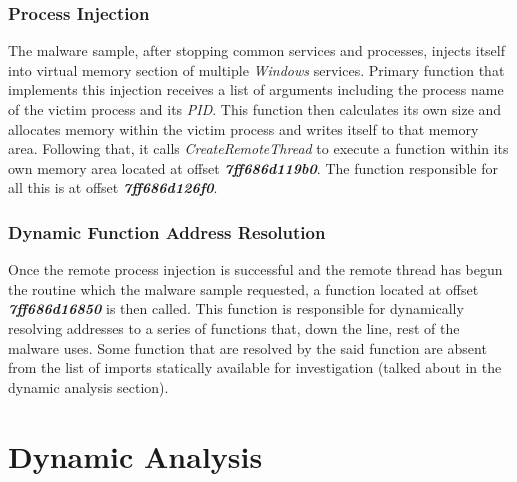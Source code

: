 \documentclass[10pt,a4paper]{article}
\begin{document}
		\subsubsection*{Process Injection}
		\vspace{-1em}
		The malware sample, after stopping common services and processes, injects itself into virtual memory section of multiple \textit{Windows} services.
		Primary function that implements this injection receives a list of arguments including the process name of the victim process and its \textit{PID}.
		This function then calculates its own size and allocates memory within the victim process and writes itself to that memory area.
		Following that, it calls \textit{CreateRemoteThread} to execute a function within its own memory area located at offset \textit{\textbf{7ff686d119b0}}.
		The function responsible for all this is at offset \textit{\textbf{7ff686d126f0}}.

		\subsubsection*{Dynamic Function Address Resolution}
		\vspace{-1em}
		Once the remote process injection is successful and the remote thread has begun the routine which the malware sample requested, a function located at offset \textit{\textbf{7ff686d16850}} is then called.
		This function is responsible for dynamically resolving addresses to a series of functions that, down the line, rest of the malware uses.
		Some function that are resolved by the said function are absent from the list of imports statically available for investigation (talked about in the dynamic analysis section).
\newpage
\section{Dynamic Analysis}
\end{document}
